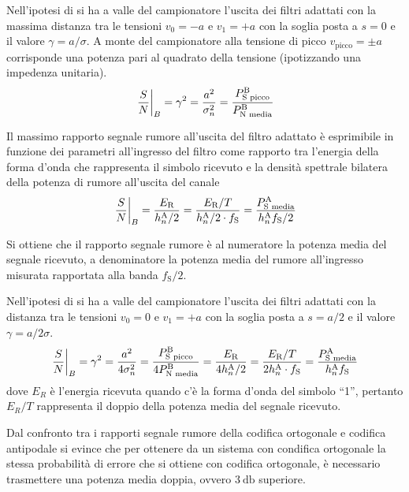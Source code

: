 Nell'ipotesi di  si ha a valle del campionatore l'uscita dei filtri adattati con la massima distanza tra le tensioni $v_0=-a$ e $v_1=+a$ con la soglia posta a $s=0$ e il valore $\gamma=a/\sigma$. A monte del campionatore alla tensione di picco $v_\text{picco}=\pm a$ corrisponde una potenza pari al quadrato della tensione (ipotizzando una impedenza unitaria).
\begin{equation}
\left.{\frac{S}{N}}\right\rvert_{B}=\gamma^2=\frac{a^2}{\sigma_n^2}=\frac{P_\text{S picco}^\text{B}}{P_\text{N media}^\text{B}}
\label{eq:rapporto_segnale_rumore_uscita_filtro_adattato}
\end{equation}

Il massimo rapporto segnale rumore all'uscita del filtro adattato è esprimibile in funzione dei parametri all'ingresso del filtro come rapporto tra l'energia della forma d'onda che rappresenta il simbolo ricevuto e la densità spettrale bilatera della potenza di rumore all'uscita del canale
\begin{equation}
\left.{\frac{S}{N}}\right\rvert_{B}=\frac{E_\text{R}}{h_n^\text{A}/2}=\frac{E_\text{R}/T}{h_n^\text{A}/2\cdot f_\text{S}}=\frac{P_\text{S media}^\text{A}}{h_n^\text{A} f_\text{S}/2}
\end{equation}

Si ottiene che il rapporto segnale rumore è al numeratore la potenza media del segnale ricevuto, a denominatore la potenza media del rumore all'ingresso misurata rapportata alla banda $f_\text{S}/2$.

Nell'ipotesi di  si ha a valle del campionatore l'uscita dei filtri adattati con la distanza tra le tensioni $v_0=0$ e $v_1=+a$ con la soglia posta a $s=a/2$ e il valore $\gamma=a/2\sigma$. 
\begin{equation}
\left.{\frac{S}{N}}\right\rvert_{B}=\gamma^2=\frac{a^2}{4\sigma_n^2}=\frac{P_\text{S picco}^\text{B}}{4 P_\text{N media}^\text{B}}=\frac{E_\text{R}}{4 h_n^\text{A}/2}=\frac{E_\text{R}/T}{2 h_n^\text{A}\cdot f_\text{S}}=\frac{P_\text{S media}^\text{A}}{h_n^\text{A} f_\text{S}}
\end{equation}
dove $E_R$ è l'energia ricevuta quando c'è la forma d'onda del simbolo “1”, pertanto $E_R/T$ rappresenta il doppio della potenza media del segnale ricevuto.

Dal confronto tra i rapporti segnale rumore della codifica ortogonale e codifica antipodale si evince che per ottenere da un sistema con condifica ortogonale la stessa probabilità di errore che si ottiene con codifica ortogonale, è necessario trasmettere una potenza media doppia, ovvero $\SI{3}{\decibel}$ superiore.

